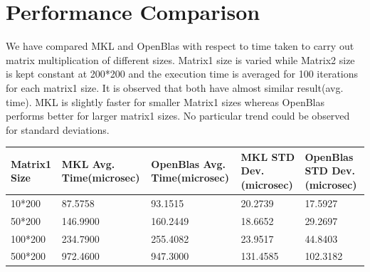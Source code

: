 \documentclass{article}
\begin{document}
\section{Performance Comparison}
We have compared MKL and OpenBlas with respect to time taken to carry out matrix multiplication of different sizes. Matrix1 size is varied while Matrix2 size is kept constant at 200*200 and the execution time is averaged for 100 iterations for each matrix1 size. It is observed that both have almost similar result(avg. time). MKL is slightly faster for smaller Matrix1 sizes whereas OpenBlas performs better for larger matrix1 sizes. No particular trend could be observed for standard deviations. 
\begin{center}
\begin{tabular}{ | m{5em} | m{2.5cm}| m{2.5cm} | m{2.5cm}| m{2.5cm}| } 
\hline
Matrix1 Size & MKL Avg. Time(microsec) & OpenBlas Avg. Time(microsec) & MKL STD Dev.(microsec) & OpenBlas STD Dev.(microsec) \\ 
\hline
10*200 & 87.5758 &  93.1515 & 20.2739 &  17.5927\\ 
\hline
50*200 & 146.9900 &  160.2449 & 18.6652 & 29.2697 \\ 
\hline
100*200 & 234.7900 &  255.4082 & 23.9517 & 44.8403 \\ 
\hline
500*200 & 972.4600 & 947.3000 & 131.4585 & 102.3182 \\ 
\hline
\end{tabular}
\end{center}
\end{document}
